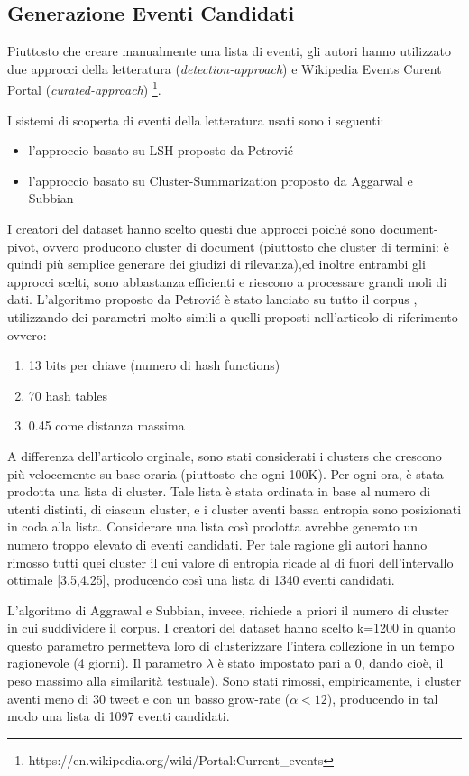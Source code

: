 \subsection{Generazione Eventi Candidati}
Piuttosto che creare manualmente una lista di eventi, gli autori hanno utilizzato due approcci della letteratura (\emph{detection-approach}) e Wikipedia Events Curent Portal (\emph{curated-approach}) \footnote{https://en.wikipedia.org/wiki/Portal:Current\_events}.


I sistemi di scoperta di eventi della letteratura usati sono i seguenti:
\begin{itemize}
\item l'approccio basato su LSH proposto da Petrovi\'c \cite{Petrovic:2010:SFS:1857999.1858020}
\item l'approccio basato su Cluster-Summarization proposto da Aggarwal e Subbian \cite{doi:10.1137/1.9781611972825.54}
\end{itemize}
I creatori del dataset hanno scelto questi due approcci poiché sono document-pivot, ovvero producono  cluster di document (piuttosto che cluster di termini: è quindi più semplice generare dei giudizi di rilevanza),ed inoltre entrambi gli approcci scelti, sono abbastanza efficienti e riescono a processare grandi moli di dati.
L'algoritmo proposto da Petrovi\'c è stato lanciato su tutto il  corpus , utilizzando dei parametri molto simili a quelli proposti nell'articolo di riferimento \cite{Petrovic:2010:SFS:1857999.1858020}
 ovvero: 
\begin{enumerate}
\item 13 bits per chiave (numero di hash functions)
\item 70 hash tables
\item 0.45 come distanza massima
\end{enumerate} 
A differenza dell'articolo orginale, sono stati considerati i clusters che crescono più velocemente su base oraria (piuttosto che ogni 100K). Per ogni ora, è stata prodotta una lista di cluster. Tale lista è stata ordinata in base al numero di utenti distinti, di ciascun cluster, e i cluster aventi bassa entropia sono posizionati in coda alla lista. Considerare una lista così prodotta avrebbe generato un numero troppo elevato di eventi candidati. Per tale ragione gli autori hanno rimosso tutti quei cluster il cui valore di entropia ricade al di fuori dell'intervallo ottimale [3.5,4.25]\cite{Petrovic:2010:SFS:1857999.1858020}, producendo così una lista di 1340 eventi candidati.

L'algoritmo di Aggrawal e Subbian, invece, richiede a priori il numero di cluster in cui suddividere il corpus. I creatori del dataset hanno scelto k=1200 in quanto questo parametro permetteva loro di clusterizzare l'intera collezione in un tempo ragionevole (4 giorni). Il parametro $\lambda$ è stato impostato pari a $0$, dando cioè, il peso massimo alla similarità testuale).
Sono stati rimossi, empiricamente, i cluster aventi meno di 30 tweet e con un basso grow-rate ($\alpha<12$), producendo in tal modo una lista di 1097 eventi candidati.

